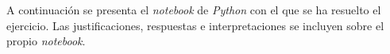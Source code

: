 A continuación se presenta el \textit{notebook} de \textit{Python} con el que se ha resuelto el ejercicio.
Las justificaciones, respuestas e interpretaciones se incluyen sobre el propio \textit{notebook}.

